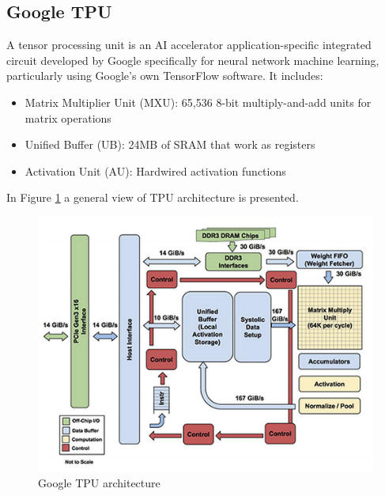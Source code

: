 \subsection{Google TPU}
A tensor processing unit is an AI accelerator application-specific integrated circuit developed by Google specifically for neural network machine learning, particularly using Google's own TensorFlow software.
It includes:
\begin{itemize}
\item Matrix Multiplier Unit (MXU): 65,536 8-bit multiply-and-add units for matrix operations
\item Unified Buffer (UB): 24MB of SRAM that work as registers
\item Activation Unit (AU): Hardwired activation functions
\end{itemize}

In Figure \ref{fig:tpuarch} a general view of TPU architecture is presented.
\begin{figure}[H]
\centering
\captionsetup{justification=centering}
\includegraphics[scale=0.8]{./figure/tpu_arch.PNG}
\caption{Google TPU architecture}
\label{fig:tpuarch}
\end{figure}


